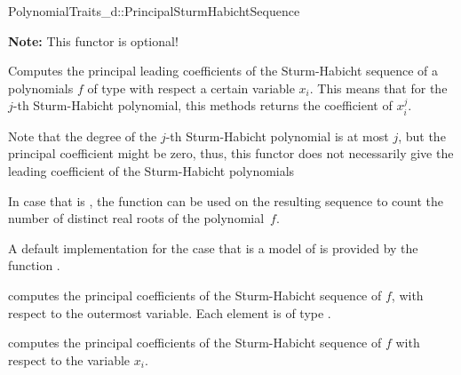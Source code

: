 \begin{ccRefConcept}{PolynomialTraits_d::PrincipalSturmHabichtSequence}

\textbf{Note:} This functor is optional!

\ccDefinition

Computes the principal leading coefficients of the Sturm-Habicht sequence 
of a polynomials $f$ of type  
with respect a certain variable $x_i$.
This means that for the $j$-th Sturm-Habicht polynomial, this methods returns
the coefficient of $x_i^j$. 

Note that the degree of the $j$-th Sturm-Habicht polynomial is at most $j$,
but the principal coefficient might be zero, thus, this functor does not
necessarily give the leading coefficient of the Sturm-Habicht polynomials

In case that  is , the function  can be used
on the resulting sequence to count the number of distinct real roots of
the polynomial~$f$.

A default implementation for the case that 
is a model of 
is provided by the function .


\ccOperations
{}
         { computes the principal coefficients of the 
           Sturm-Habicht sequence of $f$, 
           with respect to the outermost variable. Each element is of type
           .}

         { computes the principal coefficients 
           of the Sturm-Habicht sequence of $f$ 
           with respect to the variable $x_i$.}


\ccSeeAlso

\\
\\
\\
\\

\end{ccRefConcept}
